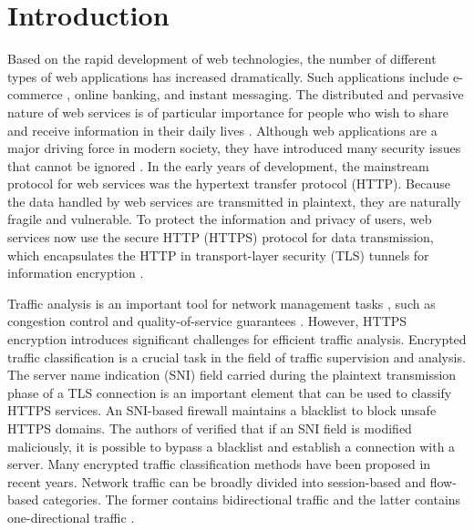 \documentclass[preprint,12pt]{elsarticle}
\begin{document}
\section{Introduction}
Based on the rapid development of web technologies, the number of different types of web applications has increased dramatically. Such applications include e-commerce \cite{Kenli2}, online banking, and instant messaging. The distributed and pervasive nature of web services is of particular importance for people who wish to share and receive information in their daily lives \cite{Kenli1}. Although web applications are a major driving force in modern society, they have introduced many security issues that cannot be ignored \cite{shbair2015efficiently}. In the early years of development, the mainstream protocol for web services was the hypertext transfer protocol (HTTP). Because the data handled by web services are transmitted in plaintext, they are naturally fragile and vulnerable. To protect the information and privacy of users, web services now use the secure HTTP (HTTPS) protocol for data transmission, which encapsulates the HTTP in transport-layer security (TLS) tunnels for information encryption \cite{naylor2014cost}.

Traffic analysis is an important tool for network management tasks \cite{DaiHN}, such as congestion control and quality-of-service guarantees \cite{shbair2017service}. However, HTTPS encryption introduces significant challenges for efficient traffic analysis.
Encrypted traffic classification is a crucial task in the field of traffic supervision and analysis. The server name indication (SNI) field carried during the plaintext transmission phase of a TLS connection is an important element that can be used to classify HTTPS services. An SNI-based firewall maintains a blacklist to block unsafe HTTPS domains. The authors of \cite{shbair2015efficiently} verified that if an SNI field is modified maliciously, it is possible to bypass a blacklist and establish a connection with a server. Many encrypted traffic classification methods have been proposed in recent years. Network traffic can be broadly divided into session-based and flow-based categories. The former contains bidirectional traffic and the latter contains one-directional traffic \cite{wang2017end}. 
\end{document}
